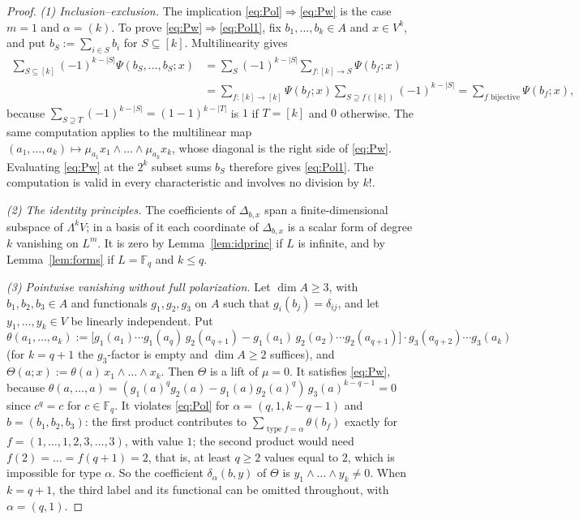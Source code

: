 \documentclass[11pt]{amsart}
\theoremstyle{definition}
\theoremstyle{remark}
\numberwithin{equation}{section}
\newcommand{\F}{\mathbb F}
\newcommand{\abs}[1]{\lvert #1\rvert}
\newcommand{\type}{\operatorname{type}}
\theoremstyle{plain}
\theoremstyle{definition}
\theoremstyle{plain}
\begin{document}
\begin{proof}
\emph{(1) Inclusion--exclusion.} The implication \eqref{eq:Pol}$\Rightarrow$\eqref{eq:Pw} is the case $m=1$ and
$\alpha=(k)$. To prove \eqref{eq:Pw}$\Rightarrow$\eqref{eq:Pol1}, fix $b_1,\dots,b_k\in A$ and $x\in V^k$, and put
$b_S:=\sum_{i\in S}b_i$ for $S\subseteq[k]$. Multilinearity gives
\begin{align*}
\sum_{S\subseteq[k]}(-1)^{k-\abs S}\Psi(b_S,\dots,b_S;x)&=\sum_S(-1)^{k-\abs S}\sum_{f\colon[k]\to S}\Psi(b_f;x)\\
&=\sum_{f\colon[k]\to[k]}\Psi(b_f;x)\sum_{S\supseteq f([k])}(-1)^{k-\abs S}=\sum_{f\text{ bijective}}\Psi(b_f;x),
\end{align*}
because $\sum_{S\supseteq T}(-1)^{k-\abs S}=(1-1)^{k-\abs T}$ is $1$ if $T=[k]$ and $0$ otherwise. The same computation
applies to the multilinear map $(a_1,\dots,a_k)\mapsto \mu_{a_1}x_1\wedge\dots\wedge \mu_{a_k}x_k$, whose diagonal is the right
side of \eqref{eq:Pw}. Evaluating \eqref{eq:Pw} at the $2^k$ subset sums $b_S$ therefore gives \eqref{eq:Pol1}.
The computation is valid in every characteristic and involves no division by $k!$.

\emph{(2) The identity principles.} The coefficients of $\Delta_{b,x}$ span a finite-dimensional subspace of $\Lambda^kV$; in a basis of it each
coordinate of $\Delta_{b,x}$ is a scalar form of degree $k$ vanishing on $L^m$. It is zero by Lemma~\ref{lem:idprinc}
if $L$ is infinite, and by Lemma~\ref{lem:forms} if $L=\F_q$ and $k\le q$.

\emph{(3) Pointwise vanishing without full polarization.} Let $\dim A\ge3$, with $b_1,b_2,b_3\in A$ and functionals $g_1,g_2,g_3$ on $A$ such that
$g_i(b_j)=\delta_{ij}$, and let $y_1,\dots,y_k\in V$ be linearly independent. Put
\[
\theta(a_1,\dots,a_k):=\bigl[g_1(a_1)\cdots g_1(a_q)\,g_2(a_{q+1})-g_1(a_1)\,g_2(a_2)\cdots g_2(a_{q+1})\bigr]
\cdot g_3(a_{q+2})\cdots g_3(a_k)
\]
(for $k=q+1$ the $g_3$\nobreakdash-factor is empty and $\dim A\ge2$ suffices), and $\Theta(a;x):=\theta(a)\,x_1\wedge\dots\wedge x_k$.
Then $\Theta$ is a lift of $\mu=0$. It satisfies \eqref{eq:Pw}, because
$\theta(a,\dots,a)=(g_1(a)^qg_2(a)-g_1(a)g_2(a)^q)\,g_3(a)^{k-q-1}=0$ since $c^q=c$ for $c\in\F_q$. It
violates \eqref{eq:Pol} for $\alpha=(q,1,k-q-1)$ and $b=(b_1,b_2,b_3)$: the first product contributes to
$\sum_{\type f=\alpha}\theta(b_f)$ exactly for $f=(1,\dots,1,2,3,\dots,3)$, with value $1$; the second product would need
$f(2)=\dots=f(q+1)=2$, that is, at least $q\ge2$ values equal to $2$, which is impossible for type $\alpha$. So the
coefficient $\delta_\alpha(b,y)$ of $\Theta$ is $y_1\wedge\dots\wedge y_k\neq0$. When $k=q+1$, the third label and its
functional can be omitted throughout, with $\alpha=(q,1)$.


\end{proof}
\end{document}
